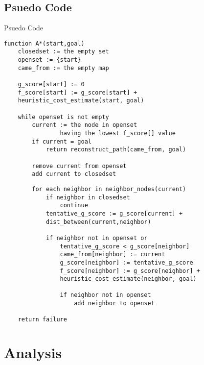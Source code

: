 \documentclass{beamer}
\begin{document}
\subsection{Psuedo Code}
\begin{frame}[fragile]{Psuedo Code}
\begin{verbatim}
function A*(start,goal)
    closedset := the empty set   
    openset := {start}   
    came_from := the empty map 
 
    g_score[start] := 0 
    f_score[start] := g_score[start] + 
    heuristic_cost_estimate(start, goal)
 
    while openset is not empty
        current := the node in openset 
        		having the lowest f_score[] value
        if current = goal
            return reconstruct_path(came_from, goal)
 
        remove current from openset
        add current to closedset
\end{verbatim}
\end{frame}

\begin{frame}[fragile]
\begin{verbatim}
        for each neighbor in neighbor_nodes(current)
            if neighbor in closedset
                continue
            tentative_g_score := g_score[current] + 
            dist_between(current,neighbor)
 
            if neighbor not in openset or 
            	tentative_g_score < g_score[neighbor] 
                came_from[neighbor] := current
                g_score[neighbor] := tentative_g_score
                f_score[neighbor] := g_score[neighbor] + 
                heuristic_cost_estimate(neighbor, goal)
                
                if neighbor not in openset
                    add neighbor to openset
 
    return failure
\end{verbatim}
\end{frame}
\section{Analysis}
\end{document}
